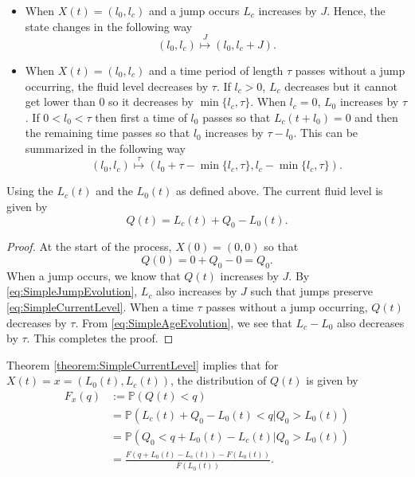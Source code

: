 \begin{itemize}
	\item When $X(t)=(l_0,l_c)$ and a jump occurs $L_c$ increases by $J$.
	Hence, the state changes in the following way
	\begin{equation}\label{eq:SimpleJumpEvolution}
	(l_0,l_c)\stackrel{J}{\mapsto} (l_0,l_c+J).
	\end{equation}
	\item When $X(t)=(l_0,l_c)$ and a time period of length $\tau$ passes without a jump occurring, the fluid level decreases by $\tau$.
	If $l_c>0$, $L_c$ decreases but it cannot get lower than $0$ so it decreases by $\min\{l_c,\tau\}$.
	When $l_c=0$, $L_0$ increases by $\tau$.
	If $0<l_0<\tau$ then first a time of $l_0$ passes so that $L_c(t+l_0)=0$ and then the remaining time passes so that $l_0$ increases by $\tau-l_0$.
	This can be summarized in the following way
	\begin{equation}\label{eq:SimpleAgeEvolution}
	(l_0,l_c)\stackrel\tau\mapsto (l_0+\tau-\min\{l_c,\tau\},l_c-\min\{l_c,\tau\}).
	\end{equation}
\end{itemize}
\begin{theorem}\label{theorem:SimpleCurrentLevel}
	Using the $L_c(t)$ and the $L_0(t)$ as defined above.
	The current fluid level is given by
	\begin{equation}\label{eq:SimpleCurrentLevel}
	Q(t)=L_c(t)+Q_0-L_0(t).
	\end{equation}
	\begin{proof}
		At the start of the process, $X(0)=(0,0)$ so that
		\[
		Q(0)=0+Q_0-0=Q_0.
		\]
		When a jump occurs, we know that $Q(t)$ increases by $J$.
		By \eqref{eq:SimpleJumpEvolution}, $L_c$ also increases by $J$ such that jumps preserve \eqref{eq:SimpleCurrentLevel}.
		When a time $\tau$ passes without a jump occurring, $Q(t)$ decreases by $\tau$.
		From \eqref{eq:SimpleAgeEvolution}, we see that $L_c-L_0$ also decreases by $\tau$.
		This completes the proof.
		
	\end{proof}
\end{theorem}
\begin{corollary}
	Theorem \ref{theorem:SimpleCurrentLevel} implies that for $X(t)=x=(L_0(t),L_c(t))$, the distribution of $Q(t)$ is given by
	\begin{equation}\label{eq:SimpleCurrentDistribution}
	\begin{split}
	F_x(q)&:=\mathbb{P}(Q(t)<q)\\
	&=\mathbb{P}(L_c(t)+Q_0-L_0(t)<q|Q_0>L_0(t))\\
	&=\mathbb{P}(Q_0<q+L_0(t)-L_c(t)|Q_0>L_0(t))\\
	&=\frac{F(q+L_0(t)-L_c(t))-F(L_0(t))}{\bar{F}(L_0(t))}.\\
	\end{split}
	\end{equation}
\end{corollary}
